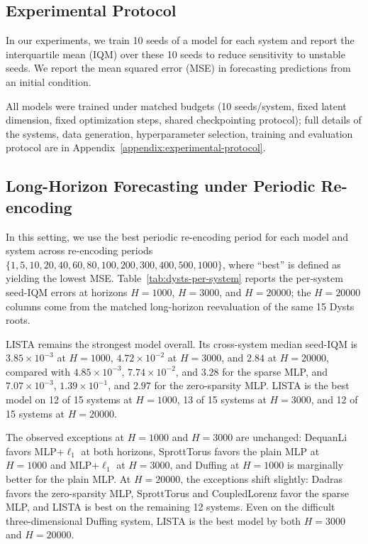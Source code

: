 \documentclass{article}
\begin{document}
\subsection{Experimental Protocol}
In our experiments, we train 10 seeds of a model for each system and report the interquartile mean (IQM) over these 10 seeds to reduce sensitivity to unstable seeds. We report the mean squared error (MSE) in forecasting predictions from an initial condition.

All models were trained under matched budgets (10 seeds/system, fixed latent dimension, fixed optimization steps, shared checkpointing protocol); full details of the systems, data generation, hyperparameter selection, training and evaluation protocol are in Appendix~\ref{appendix:experimental-protocol}.

\subsection{Long-Horizon Forecasting under Periodic Re-encoding}

In this setting, we use the best periodic re-encoding period for each model and system across re-encoding periods $\{1, 5, 10, 20, 40, 60, 80, 100, 200, 300, 400, 500, 1000\}$, where ``best'' is defined as yielding the lowest MSE. Table~\ref{tab:dysts-per-system} reports the per-system seed-IQM errors at horizons $H=1000$, $H=3000$, and $H=20000$; the $H=20000$ columns come from the matched long-horizon reevaluation of the same 15 Dysts roots.

LISTA remains the strongest model overall. Its cross-system median seed-IQM is $3.85\times 10^{-3}$ at $H=1000$, $4.72\times 10^{-2}$ at $H=3000$, and $2.84$ at $H=20000$, compared with $4.85\times 10^{-3}$, $7.74\times 10^{-2}$, and $3.28$ for the sparse MLP, and $7.07\times 10^{-3}$, $1.39\times 10^{-1}$, and $2.97$ for the zero-sparsity MLP. LISTA is the best model on 12 of 15 systems at $H=1000$, 13 of 15 systems at $H=3000$, and 12 of 15 systems at $H=20000$.

The observed exceptions at $H=1000$ and $H=3000$ are unchanged: DequanLi favors MLP+$\ell_1$ at both horizons, SprottTorus favors the plain MLP at $H=1000$ and MLP+$\ell_1$ at $H=3000$, and Duffing at $H=1000$ is marginally better for the plain MLP. At $H=20000$, the exceptions shift slightly: Dadras favors the zero-sparsity MLP, SprottTorus and CoupledLorenz favor the sparse MLP, and LISTA is best on the remaining 12 systems. Even on the difficult three-dimensional Duffing system, LISTA is the best model by both $H=3000$ and $H=20000$.
\end{document}
